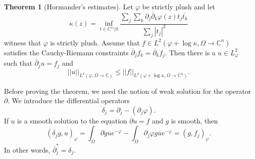 \documentclass[12pt]{report}
\newcommand{\CC}{\mathbb{C}}
\newcommand{\dbar}{\overline\partial}
\theoremstyle{definition}
\newtheorem{theorem}{Theorem}[chapter]
\begin{document}
\begin{theorem}[Hormander's estimates]
    Let $\varphi$ be strictly plush and let
    $$\kappa(z) = \inf_{t \in \CC^n \setminus 0} \frac{\sum_j\sum_k \partial_j \dbar_k \varphi(z) t_j \overline{t_k}}{\sum_j |t_j|^2}$$
    witness that $\varphi$ is strictly plush. Assume that $f \in L^2(\varphi + \log \kappa, \Omega \to \CC^n)$ satisfies the Cauchy-Riemann constraints $\dbar_j f_k = \dbar_k f_j$. Then there is a $u \in L^2_\varphi$ such that $\dbar_j u = f_j$ and
    $$||u||_{L^2(\varphi, \Omega \to \CC)} \leq ||f||_{L^2(\varphi + \log \kappa, \Omega \to \CC^n)}.$$
\end{theorem}
Before proving the theorem, we need the notion of weak solution for the operator $\dbar$. We introduce the differential operators
$$\delta_j = \partial_j - (\partial_j \varphi).$$
If $u$ is a smooth solution to the equation $\dbar u = f$ and $g$ is smooth, then
$$(\delta_j g, u)_\varphi
    = \int_\Omega \partial g \overline u e^{-\varphi} - \int_\Omega \partial_j \varphi g \overline u e^{-\varphi}
    = (g, f_j)_\varphi.$$
In other words, $\dbar_j^* = \delta_j$.
\end{document}
